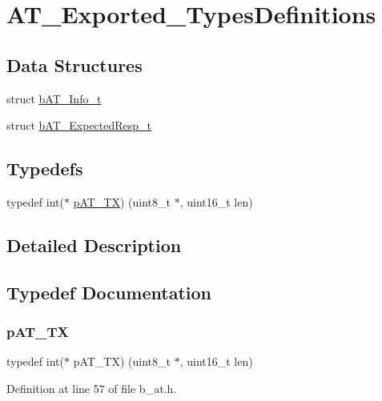 \hypertarget{group___a_t___exported___types_definitions}{}\section{A\+T\+\_\+\+Exported\+\_\+\+Types\+Definitions}
\label{group___a_t___exported___types_definitions}
\subsection*{Data Structures}
\begin{DoxyCompactItemize}
\item 
struct \mbox{\hyperlink{structb_a_t___info__t}{b\+A\+T\+\_\+\+Info\+\_\+t}}
\item 
struct \mbox{\hyperlink{structb_a_t___expected_resp__t}{b\+A\+T\+\_\+\+Expected\+Resp\+\_\+t}}
\end{DoxyCompactItemize}
\subsection*{Typedefs}
\begin{DoxyCompactItemize}
\item 
typedef int($\ast$ \mbox{\hyperlink{group___a_t___exported___types_definitions_ga160ea044085772742d8b369ae5af1f8e}{p\+A\+T\+\_\+\+TX}}) (uint8\+\_\+t $\ast$, uint16\+\_\+t len)
\end{DoxyCompactItemize}


\subsection{Detailed Description}


\subsection{Typedef Documentation}
\mbox{\label{group___a_t___exported___types_definitions_ga160ea044085772742d8b369ae5af1f8e}} 
\subsubsection{\texorpdfstring{p\+A\+T\+\_\+\+TX}{pAT\_TX}}
{\footnotesize\ttfamily typedef int($\ast$ p\+A\+T\+\_\+\+TX) (uint8\+\_\+t $\ast$, uint16\+\_\+t len)}



Definition at line 57 of file b\+\_\+at.\+h.

